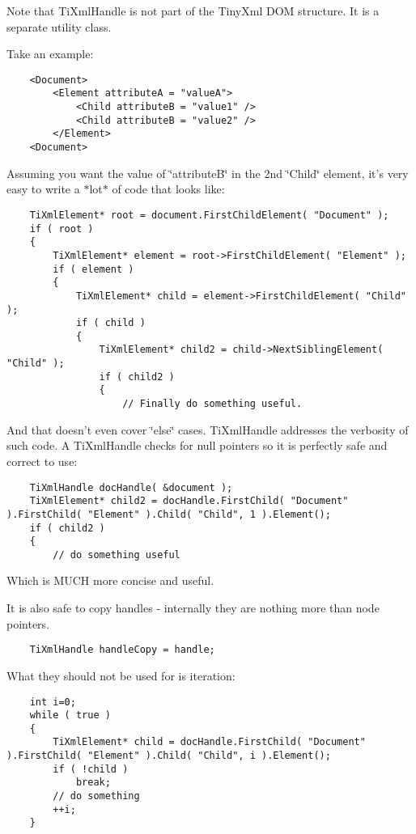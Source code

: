 Note that Ti\-Xml\-Handle is not part of the Tiny\-Xml DOM structure. It is a separate utility class.

Take an example: 

\footnotesize\begin{verbatim}
	<Document>
		<Element attributeA = "valueA">
			<Child attributeB = "value1" />
			<Child attributeB = "value2" />
		</Element>
	<Document>
	\end{verbatim}
\normalsize


Assuming you want the value of \char`\"{}attribute\-B\char`\"{} in the 2nd \char`\"{}Child\char`\"{} element, it's very easy to write a $\ast$lot$\ast$ of code that looks like:



\footnotesize\begin{verbatim}
	TiXmlElement* root = document.FirstChildElement( "Document" );
	if ( root )
	{
		TiXmlElement* element = root->FirstChildElement( "Element" );
		if ( element )
		{
			TiXmlElement* child = element->FirstChildElement( "Child" );
			if ( child )
			{
				TiXmlElement* child2 = child->NextSiblingElement( "Child" );
				if ( child2 )
				{
					// Finally do something useful.
	\end{verbatim}
\normalsize


And that doesn't even cover \char`\"{}else\char`\"{} cases. Ti\-Xml\-Handle addresses the verbosity of such code. A Ti\-Xml\-Handle checks for null pointers so it is perfectly safe and correct to use:



\footnotesize\begin{verbatim}
	TiXmlHandle docHandle( &document );
	TiXmlElement* child2 = docHandle.FirstChild( "Document" ).FirstChild( "Element" ).Child( "Child", 1 ).Element();
	if ( child2 )
	{
		// do something useful
	\end{verbatim}
\normalsize


Which is MUCH more concise and useful.

It is also safe to copy handles - internally they are nothing more than node pointers. 

\footnotesize\begin{verbatim}
	TiXmlHandle handleCopy = handle;
	\end{verbatim}
\normalsize


What they should not be used for is iteration:



\footnotesize\begin{verbatim}
	int i=0; 
	while ( true )
	{
		TiXmlElement* child = docHandle.FirstChild( "Document" ).FirstChild( "Element" ).Child( "Child", i ).Element();
		if ( !child )
			break;
		// do something
		++i;
	}
	\end{verbatim}
\normalsize


